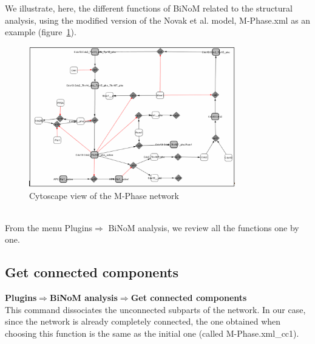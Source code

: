 We illustrate, here, the different functions of BiNoM related to the structural analysis, using the modified version of the Novak et al. model, M-Phase.xml as an example (figure~\ref{Cytoscape_view_of_the_M-Phase_network}).
\begin{figure}
\centering
\includegraphics[width=0.8\textwidth]{graphics/Cytoscape_view_of_the_M-Phase_network.png}
\caption{Cytoscape view of the M-Phase network}
\label{Cytoscape_view_of_the_M-Phase_network}
\end{figure}
\\From the menu Plugins$\Rightarrow$ BiNoM analysis, we review all the functions one by one.

\subsection{Get connected components}
\textbf{Plugins$\Rightarrow$BiNoM analysis$\Rightarrow$Get connected components}\\
This command dissociates the unconnected subparts of the network. In our case, since the network is already completely connected, the one obtained when choosing this function is the same as the initial one (called M-Phase.xml\_cc1).
